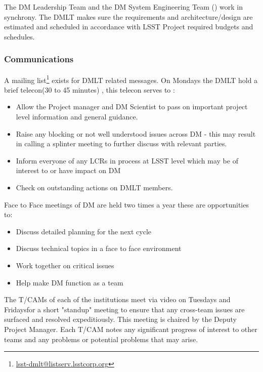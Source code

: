 The DM Leadership Team and the DM System Engineering Team () work in synchrony.
The DMLT makes sure the requirements and architecture/design are estimated and scheduled in accordance with LSST Project required budgets and schedules.

 \subsubsection{Communications}
 A mailing list\footnote{\url{lsst-dmlt@listserv.lsstcorp.org}} exists for DMLT related messages.
 On Mondays the DMLT hold a brief telecon(30 to 45 minutes) , this telecon serves to :
\begin{itemize}
\item Allow the Project manager and DM Scientist  to pass on important project level information and general guidance.
\item Raise any blocking or not well understood issues across DM - this may result in calling a splinter meeting to further discuss with relevant parties.
\item Inform everyone of any LCRs in process at LSST level which may be of interest to or  have impact on DM
\item Check on outstanding actions on DMLT members.
\end{itemize}

Face to Face meetings of DM are held two times a year these are opportunities to:
\begin{itemize}
\item Discuss detailed planning for the next cycle
\item Discuss technical topics in a face to face environment
\item Work together on critical issues
\item Help make DM function as a team
\end{itemize}

The T/CAMs of each of the institutions meet via video on Tuesdays and Fridaysfor a short "standup" meeting to ensure that any cross-team issues are surfaced and resolved expeditiously.
This meeting is chaired by the Deputy Project Manager.
Each T/CAM notes any significant progress of interest to other teams and any problems or potential problems that may arise.


